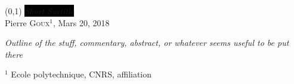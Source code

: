 \begin{frame}{\underline{\small{}}}
\vspace{-.5em}
\begin{center}
\boxput*(0,1){
    \colorbox{black}{\textcolor{ultralightbleu303}{\large{\textit{Short Surtitle}}}}
}{    
\setlength{\fboxsep}{5pt}
}\\
\vspace*{2em}
\centering
Pierre \textsc{Goux}$^1$, Mars 20, 2018 \\
\vspace{1.5em}

\begin{minipage}{.2\linewidth}\hfill\vfill\end{minipage}\begin{minipage}{.75\linewidth}\textit{\small{Outline of the stuff, commentary, abstract, or whatever seems useful to be put there } }\end{minipage}
\end{center}
\vspace{.5em}
\begin{flushright}
\footnotesize $^1$ Ecole polytechnique, CNRS, affiliation
\end{flushright}

\end{frame}